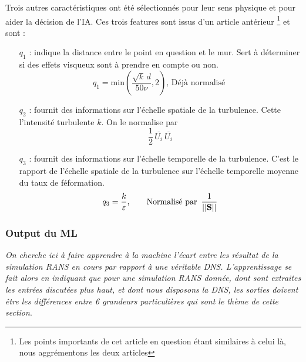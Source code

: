 \documentclass[a4paper,12pt]{report}
\newcommand{\bepar}[1]{
	\left( #1 \right)  
}
\newcommand{\norm}[1]{
	\left \vert \left \vert #1 \right \vert  \right \vert
}
\numberwithin{equation}{section} %
\begin{document}
\noindent Trois autres caractéristiques ont été sélectionnés pour leur sens physique et pour aider la décision de l'IA. Ces trois features sont issus d'un article antérieur \footnote{Les points importants de cet article en question étant similaires à celui là, nous aggrémentons les deux articles} et sont :
\begin{itemize}[leftmargin=3cm]
\item[$q_1$] : indique la distance entre le point en question et le mur. Sert à déterminer si des effets visqueux sont à prendre en compte ou non. $$ q_1 = \text{min}\bepar{\frac{\sqrt{k}\, d}{50 \nu}, 2} \text{, Déjà normalisé }$$
\item[$q_2$] : fournit des informations sur l'échelle spatiale de la turbulence. Cette l'intensité turbulente $k$. On le normalise par $$\frac{1}{2}\, \overline{U_i}\ \overline{U_i}$$
\item[$q_3$] : fournit des informations sur l'échelle temporelle de la turbulence. C'est le rapport de l'échelle spatiale de la turbulence sur l'échelle temporelle moyenne du taux de féformation. $$q_3 = \frac{k}{\varepsilon} \text{, \hspace{5mm} Normalisé par } \, \frac{1}{\norm{\textbf{S}}}$$
\end{itemize}

\subsubsection*{Output du ML}
\textit{On cherche ici à faire apprendre à la machine l'écart entre les résultat de la simulation RANS en cours par rapport à une véritable DNS. L'apprentissage se fait alors en indiquant que pour une simulation RANS donnée, dont sont extraites les entrées discutées plus haut, et dont nous disposons la DNS, les sorties doivent être les différences entre 6 grandeurs particulières qui sont le thème de cette section}.
\\[2mm]
\end{document}
